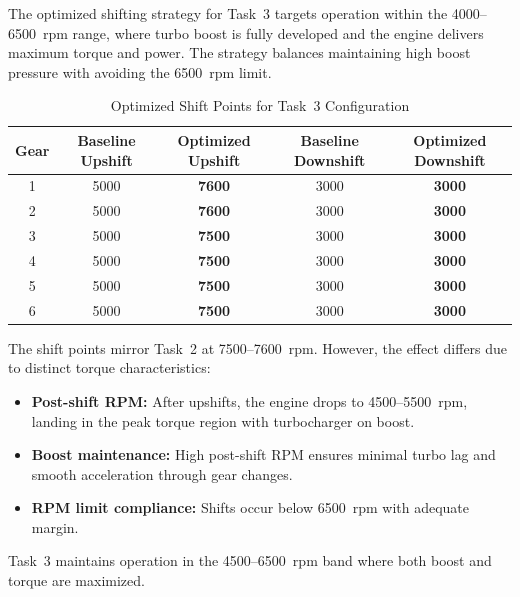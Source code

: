 The optimized shifting strategy for Task~3 targets operation within the 4000--6500~rpm range, where turbo boost is fully developed and the engine delivers maximum torque and power. The strategy balances maintaining high boost pressure with avoiding the 6500~rpm limit.

\begin{table}[H]
\centering
\caption{Optimized Shift Points for Task~3 Configuration}
\label{tab:task3_shift_timings}
\small
\begin{tabular}{@{}ccccc@{}}
\toprule
\textbf{Gear} & \textbf{Baseline Upshift} & \textbf{Optimized Upshift} & \textbf{Baseline Downshift} & \textbf{Optimized Downshift} \\
\midrule
1 & 5000 & \textcolor{optimizedcolor}{\textbf{7600}} & 3000 & \textcolor{optimizedcolor}{\textbf{3000}} \\
2 & 5000 & \textcolor{optimizedcolor}{\textbf{7600}} & 3000 & \textcolor{optimizedcolor}{\textbf{3000}} \\
3 & 5000 & \textcolor{optimizedcolor}{\textbf{7500}} & 3000 & \textcolor{optimizedcolor}{\textbf{3000}} \\
4 & 5000 & \textcolor{optimizedcolor}{\textbf{7500}} & 3000 & \textcolor{optimizedcolor}{\textbf{3000}} \\
5 & 5000 & \textcolor{optimizedcolor}{\textbf{7500}} & 3000 & \textcolor{optimizedcolor}{\textbf{3000}} \\
6 & 5000 & \textcolor{optimizedcolor}{\textbf{7500}} & 3000 & \textcolor{optimizedcolor}{\textbf{3000}} \\
\bottomrule
\end{tabular}
\end{table}

The shift points mirror Task~2 at 7500--7600~rpm. However, the effect differs due to distinct torque characteristics:

\begin{itemize}
    \item \textbf{Post-shift RPM:} After upshifts, the engine drops to 4500--5500~rpm, landing in the peak torque region with turbocharger on boost.
    \item \textbf{Boost maintenance:} High post-shift RPM ensures minimal turbo lag and smooth acceleration through gear changes.
    \item \textbf{RPM limit compliance:} Shifts occur below 6500~rpm with adequate margin.
\end{itemize}

Task~3 maintains operation in the 4500--6500~rpm band where both boost and torque are maximized.

